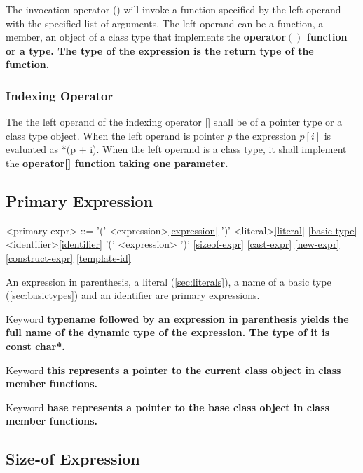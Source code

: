 \documentclass[a4paper,oneside,11pt]{article}
\begin{document}
The invocation operator () will invoke a function specified by the left operand with the specified list of arguments.
The left operand can be a function, a member, an object of a class type that implements the \bf{operator$()$} function or a type.
The type of the expression is the return type of the function.

\subsubsection{Indexing Operator}\label{indexing}

The the left operand of the indexing operator [] shall be of a pointer type or a class type object.
When the left operand is pointer \emph{p} the expression $p[i]$ is evaluated as *(p + i).
When the left operand is a class type, it shall implement the \bf{operator[]} function taking one parameter.

\subsection{Primary Expression}

\begin{grammar}
\label{primary-expr}<primary-expr> ::= '(' <expression>\ref{expression} ')'
\alt <literal>\ref{literal}
\ref{basic-type}
\alt <identifier>\ref{identifier}
\alt {} '(' <expression> ')'
\alt {}
\alt {}
\ref{sizeof-expr}
\ref{cast-expr}
\ref{new-expr}
\ref{construct-expr}
\ref{template-id}
\end{grammar}

An expression in parenthesis, a literal (\ref{sec:literals}), a name of a basic type (\ref{sec:basictypes}) and an identifier are primary expressions.

Keyword \bf{typename} followed by an expression in parenthesis yields the full name of the dynamic type of the expression.
The type of it is \bf{const char*}.

Keyword \bf{this} represents a pointer to the current class object in class member functions.

Keyword \bf{base} represents a pointer to the base class object in class member functions.

\subsection{Size-of Expression}
\end{document}
